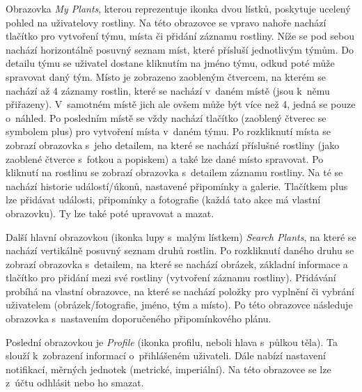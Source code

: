 \documentclass[thesis=M,czech]{FITthesis}[2019/12/23]
\begin{document}
Obrazovka \textit{My Plants}, kterou reprezentuje ikonka dvou lístků, poskytuje ucelený pohled na uživatelovy rostliny. Na této obrazovce se vpravo nahoře nachází tlačítko pro vytvoření týmu, místa či přidání záznamu rostliny. Níže se pod sebou nachází horizontálně posuvný seznam míst, které přísluší jednotlivým týmům. Do detailu týmu se uživatel dostane kliknutím na jméno týmu, odkud poté může spravovat daný tým. Místo je zobrazeno zaobleným čtvercem, na kterém se nachází až 4 záznamy rostlin, které se nachází v~daném místě (jsou k~němu přiřazeny). V~samotném místě jich ale ovšem může být více než 4, jedná se pouze o~náhled. Po posledním místě se vždy nachází tlačítko (zaoblený čtverec se symbolem plus) pro vytvoření místa v~daném týmu. Po rozkliknutí místa se zobrazí obrazovka s~jeho detailem, na které se nachází příslušné rostliny (jako zaoblené čtverce s~fotkou a popiskem) a také lze dané místo spravovat. Po kliknutí na rostlinu se zobrazí obrazovka s~detailem záznamu rostliny. Na té se nachází historie událostí/úkonů, nastavené připomínky a galerie. Tlačítkem plus lze přidávat události, připomínky a fotografie (každá tato akce má vlastní obrazovku). Ty lze také poté upravovat a mazat.

Další hlavní obrazovkou (ikonka lupy s~malým lístkem) \textit{Search Plants}, na které se nachází vertikálně posuvný seznam druhů rostlin. Po rozkliknutí daného druhu se zobrazí obrazovka s~detailem, na které se nachází obrázek, základní informace a tlačítko pro přidání mezi své rostliny (vytvoření záznamu rostliny). Přidávání probíhá na vlastní obrazovce, na které se nachází položky pro vyplnění či vybrání uživatelem (obrázek/fotografie, jméno, tým a místo). Po této obrazovce následuje obrazovka s~nastavením doporučeného připomínkového plánu.

Poslední obrazovkou je \textit{Profile} (ikonka profilu, neboli hlava s~půlkou těla). Ta slouží k~zobrazení informací o~přihlášeném uživateli. Dále nabízí nastavení notifikací, měrných jednotek (metrické, imperiální). Na této obrazovce se lze z~účtu odhlásit nebo ho smazat.
\end{document}
